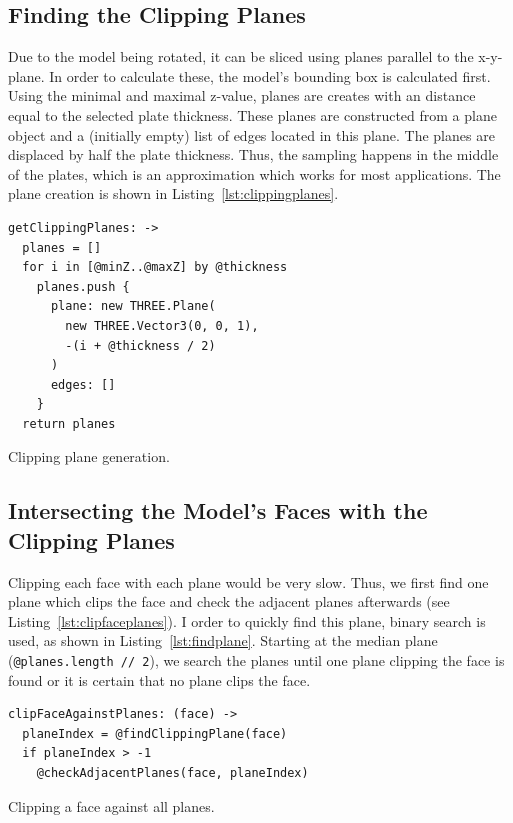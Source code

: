 \documentclass[../ClassicThesis.tex]{subfiles}
\begin{document}
\subsection{Finding the Clipping Planes}

Due to the model being rotated, it can be sliced using planes parallel to the x-y-plane. In order to calculate these, the model's bounding box is calculated first. Using the minimal and maximal z-value, planes are creates with an distance equal to the selected plate thickness. These planes are constructed from a {\threejs} plane object and a (initially empty) list of edges located in this plane. The planes are displaced by half the plate thickness. Thus, the sampling happens in the middle of the plates, which is an approximation which works for most applications. The plane creation is shown in Listing~\ref{lst:clippingplanes}.

\begin{listing}
\begin{verbatim}
getClippingPlanes: ->
  planes = []
  for i in [@minZ..@maxZ] by @thickness
    planes.push {
      plane: new THREE.Plane(
        new THREE.Vector3(0, 0, 1), 
        -(i + @thickness / 2)
      )
      edges: []
    }
  return planes
\end{verbatim}
\caption{Clipping plane generation.}
\label{lst:clippingplanes}
\end{listing}

\subsection{Intersecting the Model's Faces with the Clipping Planes}

Clipping each face with each plane would be very slow. Thus, we first find one plane which clips the face and check the adjacent planes afterwards (see Listing~\ref{lst:clipfaceplanes}). I order to quickly find this plane, binary search is used, as shown in Listing~\ref{lst:findplane}. Starting at the median plane (\texttt{@planes.length // 2}), we search the planes until one plane clipping the face is found or it is certain that no plane clips the face.

\begin{listing}
\begin{verbatim}
clipFaceAgainstPlanes: (face) ->
  planeIndex = @findClippingPlane(face)
  if planeIndex > -1
    @checkAdjacentPlanes(face, planeIndex)
\end{verbatim}
\caption{Clipping a face against all planes.}
\label{lst:clipfaceplanes}
\end{listing}
\end{document}
